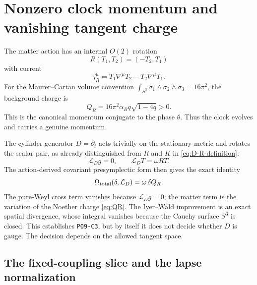 \documentclass[11pt]{article}
\theoremstyle{definition}
\theoremstyle{remark}
\newcommand{\cL}{\mathcal L}
\newcommand{\claimid}[1]{\texttt{#1}}
\begin{document}
\section{Nonzero clock momentum and vanishing tangent charge}\label{sec:charge}

The matter action has an internal $O(2)$ rotation
\begin{equation}
 R(T_1,T_2)=(-T_2,T_1)
\end{equation}
with current
\begin{equation}\label{eq:current}
 j_R^\mu=T_1\nabla^\mu T_2-T_2\nabla^\mu T_1.
\end{equation}
For the Maurer--Cartan volume convention
$\int_{S^3}\sigma_1\wedge\sigma_2\wedge\sigma_3=16\pi^2$, the background
charge is
\begin{equation}\label{eq:QR}
 Q_R=16\pi^2\alpha_B q\sqrt{1-4q}>0.
\end{equation}
This is the canonical momentum conjugate to the phase $\theta$.  Thus the
clock evolves and carries a genuine momentum.

The cylinder generator $D=\partial_t$ acts trivially on the stationary metric
and rotates the scalar pair, as already distinguished from $R$ and $K$ in
\eqref{eq:D-R-definition}:
\begin{equation}\label{eq:helical}
 \cL_Dg=0,\qquad \cL_DT=\omega RT.
\end{equation}
The action-derived covariant presymplectic form then gives the exact identity
\begin{equation}\label{eq:omega-charge}
 \Omega_{\rm total}(\delta,\cL_D)=\omega\,\delta Q_R.
\end{equation}
The pure-Weyl cross term vanishes because $\cL_Dg=0$; the matter term is the
variation of the Noether charge \eqref{eq:QR}.  The Iyer--Wald improvement is
an exact spatial divergence, whose integral vanishes because the Cauchy
surface $S^3$ is closed.  This establishes
\claimid{P09-C3}, but by itself it does not decide whether $D$ is gauge.  The
decision depends on the allowed tangent space.

\subsection{The fixed-coupling slice and the lapse normalization}
\end{document}
